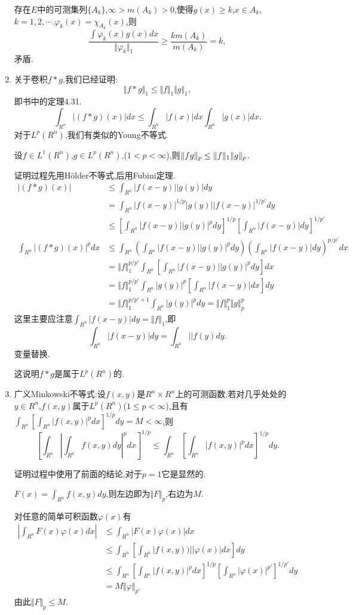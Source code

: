 \documentclass[12pt,a4paper,openany]{book}
\begin{document}
\begin{enumerate}
存在$E$中的可测集列$\{A_k\}$,$\infty > m(A_k) > 0$,使得$g(x) \ge k$,$x \in A_k$, $k=1,2,\cdots$.$\varphi_k(x)=\chi_{A_k}(x)$,则
\[
\frac{\int{\varphi_k(x)g(x)dx}}{\Vert{\varphi_k}\Vert_1} \ge \frac{km(A_k)}{m(A_k)}=k,
\]
矛盾.

\item 关于卷积$f*g$,我们已经证明:
\[
\Vert{f*g}\Vert_1 \le \Vert{f}\Vert_1\Vert{g}\Vert_1,
\]
即书中的定理4.31.
\[
\int_{R^n}{|(f*g)(x)|dx}  \le \int_{R^n}{|f(x)|dx}\int_{R^n}{|g(x)|dx}.
\]
对于$L^p(R^n)$,我们有类似的Young不等式.

设$f \in L^1(R^n)$,$g \in L^p(R^n)$,($1 < p < \infty$),则$\Vert{f \* g}\Vert_p \le \Vert{f}\Vert_1\Vert{g}\Vert_p$.

证明过程先用H\"older不等式,后用Fubini定理.
\[
\begin{aligned}
|(f*g)(x)| &\le \int_{R^n}{|f(x-y)||g(y)|dy}\\
&=\int_{R^n}{|f(x-y)|^{1/p}|g(y)||f(x-y)|^{1/p'}dy}\\
&\le [\int_{R^n}{|f(x-y)||g(y)|^pdy}]^{1/p}[\int_{R^n}{|f(x-y)|dy}]^{1/p'}\\
\int_{R^n}{|(f*g)(x)|^pdx} &\le \int_{R^n}{(\int_{R^n}{|f(x-y)||g(y)|^pdy})(\int_{R^n}{|f(x-y)|dy})^{p/p'}dx} \\
&= \Vert{f}\Vert_1^{p/p'}\int_{R^n}{[\int_{R^n}{|f(x-y)||g(y)|^pdy}]dx} \\
&= \Vert{f}\Vert_1^{p/p'}\int_{R^n}{|g(y)|^p[\int_{R^n}{|f(x-y)|dx}]dy} \\
&= \Vert{f}\Vert_1^{p/p'+1}\int_{R^n}{|g(y)|^pdy}=\Vert{f}\Vert_1^p\Vert{g}\Vert_p^p
\end{aligned}
\]
这里主要应注意$\int_{R^n}{|f(x-y)|dy}=\Vert{f}\Vert_1$,即
\[
\int_{R^n}{|f(x-y)|dy} =\int_{R^n}{||f(y)dy}.
\]
变量替换.

这说明$f*g$是属于$L^p(R^n)$的.

\item 广义Minkowski不等式:设$f(x,y)$是$R^n \times R^n$上的可测函数,若对几乎处处的$y \in R^n$,$f(x,y)$属于$L^p(R^n)$($1 \le p < \infty$),且有$\int_{R^n}{[\int_{R^n}{|f(x,y)|^pdx}]^{1/p}dy}=M<\infty$,则
\[
[\int_{R^n}{|\int_{R^n}{f(x,y)dy}|^pdx}]^{1/p} \le \int_{R^n}{[\int_{R^n}{|f(x,y)|^pdx}]^{1/p}dy}.
\]

证明过程中使用了前面的结论,对于$p=1$它是显然的.

$F(x)=\int_{R^n}{f(x,y)dy}$,则左边即为$\Vert{F}\Vert_p$,右边为$M$.

对任意的简单可积函数$\varphi(x)$有
\[
\begin{aligned}
|\int_{R^n}{F(x)\varphi(x)dx}| &\le \int_{R^n}{|F(x)\varphi(x)|dx}\\
&\le \int_{R^n}{[\int_{R^n}{|f(x,y))||\varphi(x)|dx}]dy}\\
&\le\int_{R^n}{[\int_{R^n}{|f(x,y)|^pdx}]^{1/p}[\int_{R^n}{|\varphi(x)|^{p'}}]^{1/p'}dy} \\
&=M\Vert{\varphi}\Vert_{p'}
\end{aligned}
\]
由此$\Vert{F}\Vert_p \le M$.


\end{enumerate}
\end{document}
